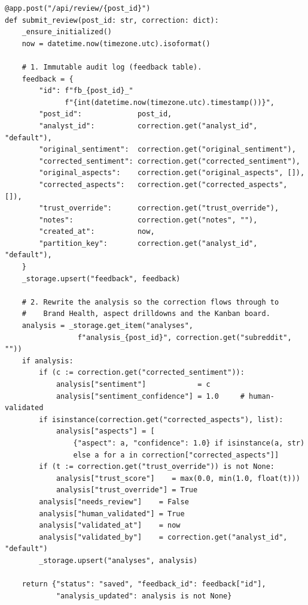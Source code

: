 \begin{lstlisting}[caption={HITL correction endpoint: feedback audit log + live analysis rewrite ({\tt src/dashboard/api.py}).},label={lst:review}]
@app.post("/api/review/{post_id}")
def submit_review(post_id: str, correction: dict):
    _ensure_initialized()
    now = datetime.now(timezone.utc).isoformat()

    # 1. Immutable audit log (feedback table).
    feedback = {
        "id": f"fb_{post_id}_"
              f"{int(datetime.now(timezone.utc).timestamp())}",
        "post_id":             post_id,
        "analyst_id":          correction.get("analyst_id", "default"),
        "original_sentiment":  correction.get("original_sentiment"),
        "corrected_sentiment": correction.get("corrected_sentiment"),
        "original_aspects":    correction.get("original_aspects", []),
        "corrected_aspects":   correction.get("corrected_aspects", []),
        "trust_override":      correction.get("trust_override"),
        "notes":               correction.get("notes", ""),
        "created_at":          now,
        "partition_key":       correction.get("analyst_id", "default"),
    }
    _storage.upsert("feedback", feedback)

    # 2. Rewrite the analysis so the correction flows through to
    #    Brand Health, aspect drilldowns and the Kanban board.
    analysis = _storage.get_item("analyses",
                 f"analysis_{post_id}", correction.get("subreddit", ""))
    if analysis:
        if (c := correction.get("corrected_sentiment")):
            analysis["sentiment"]            = c
            analysis["sentiment_confidence"] = 1.0     # human-validated
        if isinstance(correction.get("corrected_aspects"), list):
            analysis["aspects"] = [
                {"aspect": a, "confidence": 1.0} if isinstance(a, str)
                else a for a in correction["corrected_aspects"]]
        if (t := correction.get("trust_override")) is not None:
            analysis["trust_score"]    = max(0.0, min(1.0, float(t)))
            analysis["trust_override"] = True
        analysis["needs_review"]    = False
        analysis["human_validated"] = True
        analysis["validated_at"]    = now
        analysis["validated_by"]    = correction.get("analyst_id", "default")
        _storage.upsert("analyses", analysis)

    return {"status": "saved", "feedback_id": feedback["id"],
            "analysis_updated": analysis is not None}
\end{lstlisting}

